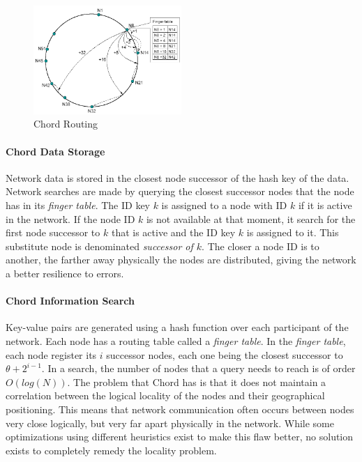 \label{sec:chord}
\begin{figure}
\center
\includegraphics[width=0.5\textwidth]{img/chord-search}
\caption{Chord Routing}
\label{fig:p2p_estructured_chord_search}
\end{figure}

\paragraph{Chord Data Storage}
Network data is stored in the closest node successor of the hash key of the
data. Network searches are made by querying the closest successor
nodes that the node has in its \textit{finger table}.
The ID key $k$ is assigned to a node with ID $k$ if it is active in the
network. If the node ID $k$ is not available at that moment, it search for the first node
successor to $k$ that is active and the ID key $k$ is assigned to it. This
substitute node is denominated \textit{successor of $k$}.
The closer a node ID is to another, the farther away physically the nodes are
distributed, giving the network a better resilience to errors.

\paragraph{Chord Information Search}
Key-value pairs are generated using a hash function over each participant of
the network.  Each node has a routing table called a \textit{finger table}.
In the \textit{finger table}, each node register its $i$ successor nodes, each
one being the closest successor to $\theta + 2^{i-1}$. 
In a search, the number of nodes that a query needs to reach is of order
$O(log(N))$.
The problem that Chord has is that it does not maintain a correlation
between the logical locality of the nodes and their geographical positioning. This
means that network communication often occurs between nodes very close
logically, but very far apart physically in the network. While some
optimizations using different heuristics exist to make this flaw better, no solution
exists to completely remedy the locality problem.


